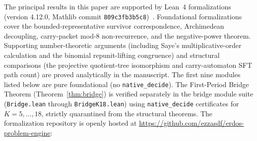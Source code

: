 \documentclass[11pt,reqno]{amsart}
\theoremstyle{plain}
\theoremstyle{definition}
\theoremstyle{remark}
\begin{document}
The principal results in this paper are supported by Lean~4 formalizations (version 4.12.0, Mathlib commit \texttt{809c3fb3b5c8})~\cite{Lean4Community}. Foundational formalizations cover the bounded-representative survivor correspondence, Archimedean decoupling, carry-packet mod-$8$ non-recurrence, and the negative-power theorem. Supporting number-theoretic arguments (including Saye's multiplicative-order calculation and the binomial repunit-lifting congruence) and structural comparisons (the projective quotient-tree isomorphism and carry-automaton SFT path count) are proved analytically in the manuscript. The first nine modules listed below are pure foundational (no \texttt{native\_decide}). The First-Period Bridge Theorem (Theorem~\ref{thm:bridge}) is verified separately in the bridge module suite (\texttt{Bridge.lean} through \texttt{BridgeK18.lean}) using \texttt{native\_decide} certificates for $K=5,\dots,18$, strictly quarantined from the structural theorems. The formalization repository is openly hosted at \url{https://github.com/ezzasdf/erdos-problem-engine}:
\end{document}
